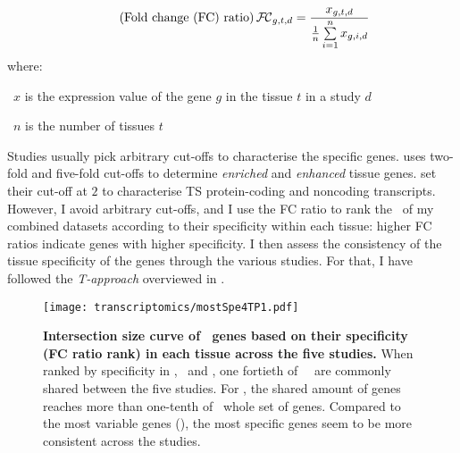 \begin{minipage}{\textwidth}
\begin{equation}
    \tag{Fold change (FC) ratio}
    \FCm_{g,t,d}=\frac{x_{g,t,d}}{\frac{1}{n}\sum\limits_{i=1}^n {x_{g,i,d}}}
\end{equation}
where:\quad\begin{eqlist}[\setlength{\itemsep}{0em}%
            \setlength{\topsep}{0em}%
            \setlength{\partopsep}{0em}%
            \setlength{\parskip}{0em}%
            \setlength{\parsep}{0em}]
        \item[\textbullet\ $x$] is the expression value of the gene $g$
            in the tissue $t$ in a study $d$
        \item[\textbullet\ $n$] is the number of tissues $t$
\end{eqlist}
\end{minipage}

Studies usually pick arbitrary cut-offs to characterise the specific genes.
\citet{Uhlen2015} uses two-fold and five-fold cut-offs
to determine \emph{enriched} and \emph{enhanced} tissue genes.
\citet{Zhu2016-xo} set their cut-off at $2$ to characterise \gls{TS} protein-coding
and noncoding transcripts.
However,
I avoid arbitrary cut-offs, and
I use the FC ratio to rank the \pcgs\ of my combined datasets according
to their specificity within each tissue:
higher FC ratios indicate genes with higher specificity.
I then assess the consistency of the tissue specificity of the genes through the
various studies.
For that, I have followed the \emph{T-approach} overviewed in .\mybr\

\begin{figure}[!thb]
    \texttt{[image: transcriptomics/mostSpe4TP1.pdf]}\centering
    \vspace{-0.2in}
    \caption[Intersection size curve of \setOne\ genes based on their FC ratio
    rank in each tissue across the five studies]{\label{fig:mostSpe4T}\textbf{Intersection
    size curve of \setOne\ genes based on their specificity (FC ratio rank)
    in each tissue across the five studies.}
    When ranked by specificity in \heart, \kidney\ and \liver,
    one fortieth of \setOne\ \pcgs\ are commonly shared between the five studies.
    For \testis, the shared amount of genes reaches more than one-tenth of \setOne\
    whole set of genes.
    Compared to the most variable genes (),
    the most specific genes seem to be more consistent across the studies.
    }
\end{figure}

